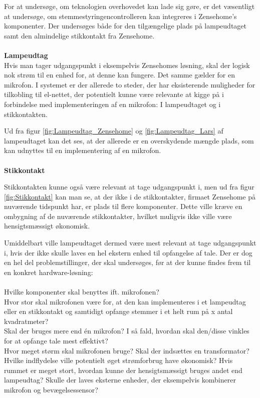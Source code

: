 For at undersøge, om teknologien overhovedet kan lade sig gøre, er det væsentligt at undersøge, om stemmestyringencontrolleren kan integreres i Zensehome's komponenter. Der undersøges både for den tilgængelige plads på lampeudtaget samt den almindelige stikkontakt fra Zensehome. \\\\

{\bf Lampeudtag}\\
Hvis man tager udgangspunkt i eksempelvis Zensehomes løsning, skal der logisk nok strøm til en enhed for, at denne kan fungere. Det samme gælder for en mikrofon. I systemet er der allerede to steder, der har eksisterende muligheder for tilkobling til el-nettet, der potentielt kunne være relevante at kigge på i forbindelse med implementeringen af en mikrofon: I lampeudtaget og i stikkontakten.\\


Ud fra figur \ref{fig:Lampeudtag_Zensehome} og \ref{fig:Lampeudtag_Lars} af lampeudtaget kan det ses, at der allerede er en overskydende mængde plads, som kan udnyttes til en implementering af en mikrofon. \\\\

{\bf Stikkontakt}\\

Stikkontakten kunne også være relevant at tage udgangspunkt i, men ud fra figur \ref{fig:Stikkontakt} kan man se, at der ikke i de stikkontakter, firmaet Zensehome på nuværende tidspunkt har, er plads til flere komponenter. Dette ville kræve en ombygning af de nuværende stikkontakter, hvilket muligvis ikke ville være hensigtsmæssigt økonomisk.

Umiddelbart ville lampeudtaget dermed være mest relevant at tage udgangspunkt i, hvis der ikke skulle laves en hel ekstern enhed til opfangelse af tale. Der er dog en hel del problemstillinger, der skal undersøges, før at der kunne findes frem til en konkret hardware-løsning:\\\\
Hvilke komponenter skal benyttes ift. mikrofonen?\\
Hvor stor skal mikrofonen være for, at den kan implementeres i et lampeudtag eller en stikkontakt og samtidigt opfange stemmer i et helt rum på x antal kvadratmeter?\\
Skal der bruges mere end én mikrofon? I så fald, hvordan skal den/disse vinkles for at opfange tale mest effektivt?\\
Hvor meget størm skal mikrofonen bruge? Skal der indsættes en transformator? Hvilke indflydelse ville potentielt øget strømforbrug have økonomisk?
Hvis rummet er meget stort, hvordan kunne der hensigtsmæssigt bruges andet end lampeudtag? Skulle der laves eksterne enheder, der eksempelvis kombinerer mikrofon og bevægelsessensor?\\

